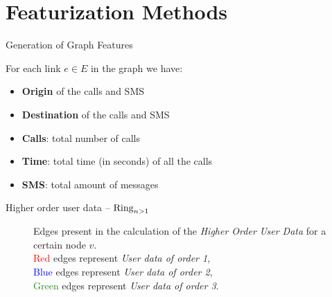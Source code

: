 \documentclass[usenames,dvipsnames]{beamer}
\begin{document}
\section{Featurization Methods}


\begin{frame}{Generation of Graph Features}

For each link $e \in E$ in the graph we have:

\begin{itemize}
	\item \textbf{Origin} of the calls and SMS
	\item \textbf{Destination} of the calls and SMS
	\item \textbf{Calls}: total number of calls
	\item \textbf{Time}: total time (in seconds) of all the calls
	\item \textbf{SMS}: total amount of messages
\end{itemize}

\end{frame}


\begin{frame}{Higher order user data -- $\operatorname{Ring}_{n > 1}$ }

\begin{figure}
\centering
\framebox[\columnwidth]{%
	
}
\caption{Edges present in the calculation of the \emph{Higher Order User Data} for a certain node $v$. \\
\textcolor{red}{Red} edges represent \emph{User data of order 1},\\
 \textcolor{blue}{Blue} edges represent \emph{User data of order 2}, \\
 \textcolor{ForestGreen}{Green} edges represent \emph{User data of order 3}.}
\label{fig:higherorderuserdata}
\end{figure}


\end{frame}
\end{document}
